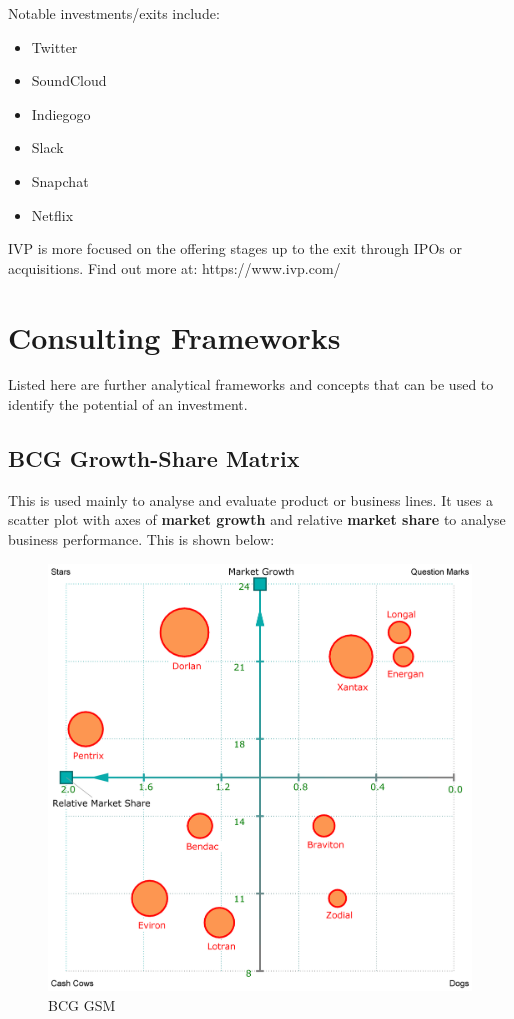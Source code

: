 \documentclass[a4paper]{article}
\begin{document}
{\vspace{5pt}
\noindent Notable investments/exits include:
\begin{itemize}
	\item Twitter
	\item SoundCloud
	\item Indiegogo
	\item Slack
	\item Snapchat
	\item Netflix
\end{itemize}

\vspace{5pt}
\noindent IVP is more focused on the offering stages up to the exit through IPOs or acquisitions. Find out more at: https://www.ivp.com/


\newpage
\section{Consulting Frameworks}
Listed here are further analytical frameworks and concepts that can be used to identify the potential of an investment.

\subsection{BCG Growth-Share Matrix}
This is used mainly to analyse and evaluate product or business lines. It uses a scatter plot with axes of \textbf{market growth} and relative \textbf{market share} to analyse business performance. This is shown below:

\begin{figure}[h]
	\centering
\includegraphics[scale=.17]{bcg-gsm}
	\caption{BCG GSM}
	\label{fig:bcg-gsm}
\end{figure}

}
\end{document}
